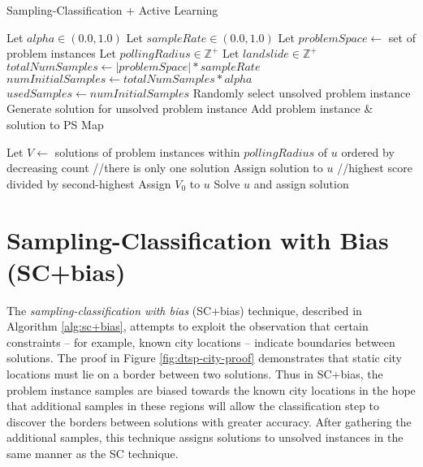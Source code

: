 \begin{algorithm}
  \caption{Sampling-Classification + Active Learning}   
  \label{alg:sc+al}
  \small
  \begin{algorithmic}[1] %
    \State Let $alpha \in (0.0,1.0)$
    \State Let $sampleRate \in (0.0,1.0)$
    \State Let $problemSpace \leftarrow$ set of problem instances
    \State Let $pollingRadius \in \mathbb{Z}^+$ 
    \State Let $landslide \in  \mathbb{Z}^+$ 
    \State $totalNumSamples \leftarrow |problemSpace| * sampleRate$
    \State $numInitialSamples \leftarrow totalNumSamples * alpha$ 
    \State $usedSamples  \leftarrow numInitialSamples$
      \State Randomly select unsolved problem instance
      \State Generate solution for unsolved problem instance
      \State Add problem instance \& solution to PS Map
    \EndFor
  
       \State Let $V \leftarrow$ solutions of problem instances within $pollingRadius$ of $u$ ordered by decreasing count
        \hspace{60pt} //there is only one solution
         \State Assign solution to $u$
        \hspace{35pt} //highest score divided by second-highest
          \State Assign $V_0$ to $u$
          \State Solve $u$ and assign solution
        \Else
        \EndIf
      \EndFor

  \end{algorithmic}
\end{algorithm}


\section{Sampling-Classification with Bias (SC+bias)}

The \textit{sampling-classification with bias} (SC+bias) technique, described in Algorithm \ref{alg:sc+bias}, attempts to exploit the observation that certain constraints -- for example, known city locations -- indicate boundaries between solutions.  The proof in Figure \ref{fig:dtsp-city-proof} demonstrates that static city locations must lie on a border between two solutions.  Thus in SC+bias, the problem instance  samples are biased towards the known city locations in the hope that additional samples in these regions will allow the classification step to discover the borders between solutions with greater accuracy. After gathering the additional samples, this technique assigns solutions to unsolved instances in the same manner as the SC technique.

